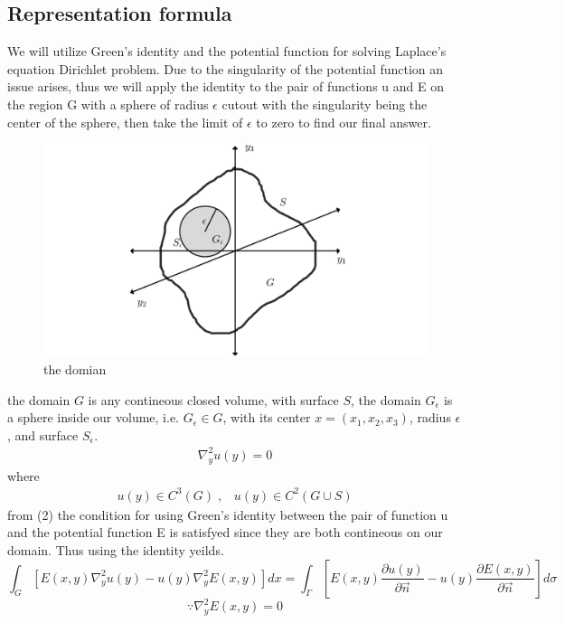 \documentclass[]{article}
\begin{document}
\subsection{Representation formula}
We will utilize Green's identity and the potential function for solving Laplace's equation Dirichlet problem. Due to the singularity of the potential function an issue arises, thus we will apply the identity to the pair of functions u and E on the region G with a sphere of radius $\epsilon$ cutout with the singularity being the center of the sphere, then take the limit of $\epsilon$ to zero to find our final answer.
\begin{figure}[h]
\begin{center}
\includegraphics[scale=0.15]{rep.png}
\captionlabelfalse
\caption{the domian}
\end{center}
\end{figure}
the domain $G$ is any contineous closed volume, with surface $S$, the domain $G_\epsilon$ is a sphere inside our volume, i.e. $G_\epsilon \in G$, with its center $x = (x_1,x_2,x_3)$, radius $\epsilon$, and surface $S_\epsilon$. 
\begin{align}
\nabla_{y}^{2} u(y) =0
\end{align}
where
\begin{align}
u(y) \in C^3(G)\;,\;\;\; u(y) \in C^2(G\cup S)
\end{align}
from (2) the condition for using Green's identity between the pair of function u and the potential function E is satisfyed since they are both contineous on our domain. Thus using the identity yeilds.
\[
    \int_G \left[E(x,y)\nabla_{y}^{2} u(y) - u(y)\nabla_{y}^{2} E(x,y)\right]dx = \int_\Gamma \left[E(x,y)\frac{\partial u(y)}{\partial \vec{n}}-u(y)\frac{\partial E(x,y)}{\partial \vec{n}}\right] d\sigma    
\]
\[
  \because \nabla_{y}^{2} E(x,y) = 0    
\]
\end{document}
